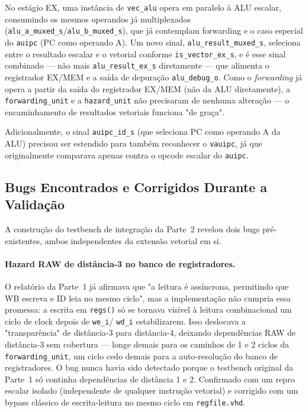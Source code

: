 \documentclass[12pt, a4paper]{article}
\newcommand{\code}[1]{\texttt{#1}}
\begin{document}
No estágio EX, uma instância de \code{vec\_alu} opera em paralelo à ALU
escalar, consumindo os mesmos operandos já multiplexados
(\code{alu\_a\_muxed\_s}/\code{alu\_b\_muxed\_s}), que já contemplam
forwarding e o caso especial do \code{auipc} (PC como operando A). Um
novo sinal, \code{alu\_result\_muxed\_s}, seleciona entre o resultado
escalar e o vetorial conforme \code{is\_vector\_ex\_s}, e é esse sinal
combinado --- não mais \code{alu\_result\_ex\_s} diretamente --- que
alimenta o registrador EX/MEM e a saída de depuração
\code{alu\_debug\_o}. Como o \emph{forwarding} já opera a partir da
saída do registrador EX/MEM (não da ALU diretamente), a
\code{forwarding\_unit} e a \code{hazard\_unit} não precisaram de
nenhuma alteração --- o encaminhamento de resultados vetoriais funciona
"de graça".

Adicionalmente, o sinal \code{auipc\_id\_s} (que seleciona PC como
operando A da ALU) precisou ser estendido para também reconhecer o
\code{vauipc}, já que originalmente comparava apenas contra o opcode
escalar do \code{auipc}.

\subsection{Bugs Encontrados e Corrigidos Durante a Validação}

A construção do testbench de integração da Parte~2 revelou dois bugs
pré-existentes, ambos independentes da extensão vetorial em si.

\paragraph{Hazard RAW de distância-3 no banco de registradores.} O
relatório da Parte~1 já afirmava que "a leitura é assíncrona, permitindo
que WB escreva e ID leia no mesmo ciclo", mas a implementação não
cumpria essa promessa: a escrita em \code{regs()} só se tornava visível
à leitura combinacional um ciclo de clock depois de \code{we\_i}/
\code{wd\_i} estabilizarem. Isso deslocava a "transparência" de
distância-3 para distância-4, deixando dependências RAW de distância-3
sem cobertura --- longe demais para os caminhos de 1 e 2 ciclos da
\code{forwarding\_unit}, um ciclo cedo demais para a auto-resolução do
banco de registradores. O bug nunca havia sido detectado porque o
testbench original da Parte~1 só continha dependências de distância 1 e
2. Confirmado com um repro escalar isolado (independente de qualquer
instrução vetorial) e corrigido com um bypass clássico de
escrita-leitura no mesmo ciclo em \code{regfile.vhd}.
\end{document}
